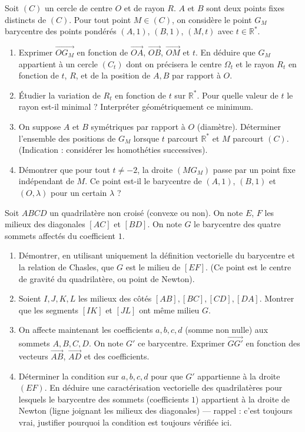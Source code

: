 \documentclass[11pt]{article}
\begin{document}
\begin{exercice}
Soit $(C)$ un cercle de centre $O$ et de rayon $R$. $A$ et $B$ sont deux points fixes distincts de $(C)$. Pour tout point $M \in (C)$, on considère le point $G_M$ barycentre des points pondérés $(A, 1)$, $(B, 1)$, $(M, t)$ avec $t \in \mathbb{R}^*$.
\begin{enumerate}
    \item Exprimer $\overrightarrow{OG_M}$ en fonction de $\overrightarrow{OA}$, $\overrightarrow{OB}$, $\overrightarrow{OM}$ et $t$. En déduire que $G_M$ appartient à un cercle $(C_t)$ dont on précisera le centre $\Omega_t$ et le rayon $R_t$ en fonction de $t$, $R$, et de la position de $A, B$ par rapport à $O$.
    \item Étudier la variation de $R_t$ en fonction de $t$ sur $\mathbb{R}^*$. Pour quelle valeur de $t$ le rayon est-il minimal ? Interpréter géométriquement ce minimum.
    \item On suppose $A$ et $B$ symétriques par rapport à $O$ (diamètre). Déterminer l'ensemble des positions de $G_M$ lorsque $t$ parcourt $\mathbb{R}^*$ et $M$ parcourt $(C)$. (Indication : considérer les homothéties successives).
    \item Démontrer que pour tout $t \neq -2$, la droite $(MG_M)$ passe par un point fixe indépendant de $M$. Ce point est-il le barycentre de $(A,1)$, $(B,1)$ et $(O, \lambda)$ pour un certain $\lambda$ ?
\end{enumerate}
\end{exercice}

\begin{exercice}
Soit $ABCD$ un quadrilatère non croisé (convexe ou non). On note $E$, $F$ les milieux des diagonales $[AC]$ et $[BD]$. On note $G$ le barycentre des quatre sommets affectés du coefficient $1$.
\begin{enumerate}
    \item Démontrer, en utilisant uniquement la définition vectorielle du barycentre et la relation de Chasles, que $G$ est le milieu de $[EF]$. (Ce point est le centre de gravité du quadrilatère, ou point de Newton).
    \item Soient $I, J, K, L$ les milieux des côtés $[AB], [BC], [CD], [DA]$. Montrer que les segments $[IK]$ et $[JL]$ ont même milieu $G$.
    \item On affecte maintenant les coefficients $a, b, c, d$ (somme non nulle) aux sommets $A, B, C, D$. On note $G'$ ce barycentre. Exprimer $\overrightarrow{GG'}$ en fonction des vecteurs $\overrightarrow{AB}$, $\overrightarrow{AD}$ et des coefficients.
    \item Déterminer la condition sur $a, b, c, d$ pour que $G'$ appartienne à la droite $(EF)$. En déduire une caractérisation vectorielle des quadrilatères pour lesquels le barycentre des sommets (coefficients $1$) appartient à la droite de Newton (ligne joignant les milieux des diagonales) — rappel : c'est toujours vrai, justifier pourquoi la condition est toujours vérifiée ici.
\end{enumerate}
\end{exercice}
\end{document}
